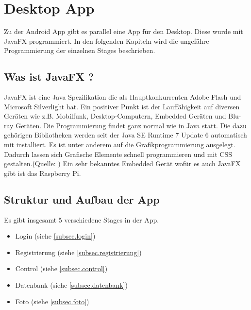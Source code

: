 
\chapter{Desktop App}
Zu der Android App gibt es parallel eine App für den Desktop. Diese wurde mit JavaFX programmiert. In den folgenden Kapiteln wird die ungefähre Programmierung der einzelnen Stages beschrieben.

				
				
\section{Was ist JavaFX ?}
JavaFX ist eine Java Spezifikation die als Hauptkonkurrenten Adobe Flash und Microsoft Silverlight hat. Ein positiver Punkt ist der Lauffähigkeit auf diversen Geräten wie z.B. Mobilfunk, Desktop-Computern, Embedded Geräten und Blu-ray Geräten. Die Programmierung findet ganz normal wie in Java statt. Die dazu gehörigen Bibliotheken werden seit der Java SE Runtime 7 Update 6 automatisch mit installiert. Es ist unter anderem auf die Grafikprogrammierung ausgelegt. Dadurch lassen sich Grafische Elemente schnell programmieren und mit CSS gestalten.(Quelle: \cite{bib.jFXRaspPi})
Ein sehr bekanntes Embedded Gerät wofür es auch JavaFX gibt ist das Raspberry Pi.

\section{Struktur und Aufbau der App}
Es gibt insgesamt 5 verschiedene Stages in der App.
\begin{itemize}
	\item Login (siehe \ref{subsec.login})
	\item Registrierung (siehe \ref{subsec.registrierung})
	\item Control (siehe \ref{subsec.control})
	\item Datenbank (siehe \ref{subsec.datenbank})
	\item Foto (siehe \ref{subsec.foto})
\end{itemize}

